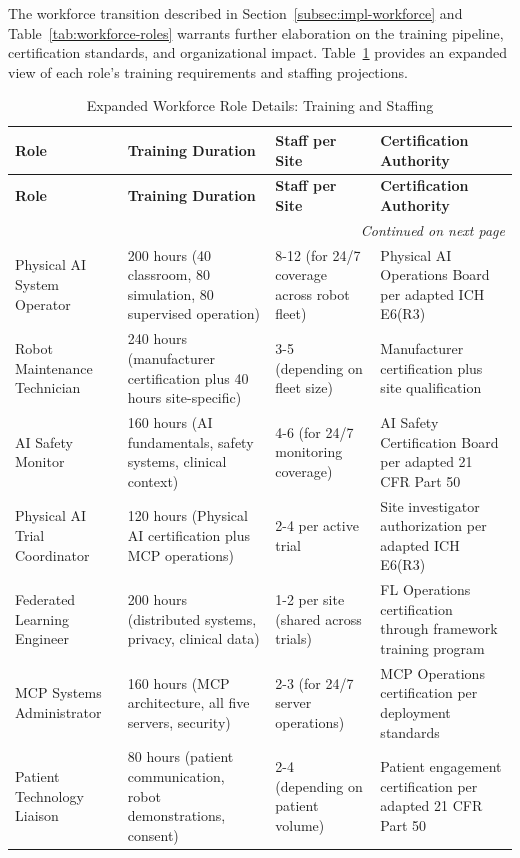 The workforce transition described in Section~\ref{subsec:impl-workforce}
and Table~\ref{tab:workforce-roles} warrants further elaboration on the
training pipeline, certification standards, and organizational impact.
Table~\ref{tab:workforce-detailed-roles} provides an expanded view of each
role's training requirements and staffing projections.

\begin{longtable}{p{2.8cm} p{2.8cm} p{2.8cm} p{3.5cm}}
\caption{Expanded Workforce Role Details: Training and Staffing}
\label{tab:workforce-detailed-roles} \\
\toprule
\textbf{Role} & \textbf{Training Duration} & \textbf{Staff per Site} & \textbf{Certification Authority} \\
\midrule
\endfirsthead
\toprule
\textbf{Role} & \textbf{Training Duration} & \textbf{Staff per Site} & \textbf{Certification Authority} \\
\midrule
\endhead
\midrule
\multicolumn{4}{r}{\textit{Continued on next page}} \\
\bottomrule
\endfoot
\bottomrule
\endlastfoot
Physical AI System Operator & 200 hours (40 classroom, 80 simulation, 80 supervised operation) & 8-12 (for 24/7 coverage across robot fleet) & Physical AI Operations Board per adapted ICH E6(R3) \cite{ich-adapt} \\
\midrule
Robot Maintenance Technician & 240 hours (manufacturer certification plus 40 hours site-specific) & 3-5 (depending on fleet size) & Manufacturer certification plus site qualification \\
\midrule
AI Safety Monitor & 160 hours (AI fundamentals, safety systems, clinical context) & 4-6 (for 24/7 monitoring coverage) & AI Safety Certification Board per adapted 21 CFR Part 50 \cite{cfr50-adapt} \\
\midrule
Physical AI Trial Coordinator & 120 hours (Physical AI certification plus MCP operations) & 2-4 per active trial & Site investigator authorization per adapted ICH E6(R3) \cite{ich-adapt} \\
\midrule
Federated Learning Engineer & 200 hours (distributed systems, privacy, clinical data) & 1-2 per site (shared across trials) & FL Operations certification through framework training program \\
\midrule
MCP Systems Administrator & 160 hours (MCP architecture, all five servers, security) & 2-3 (for 24/7 server operations) & MCP Operations certification per deployment standards \\
\midrule
Patient Technology Liaison & 80 hours (patient communication, robot demonstrations, consent) & 2-4 (depending on patient volume) & Patient engagement certification per adapted 21 CFR Part 50 \cite{cfr50-adapt} \\

\end{longtable}
